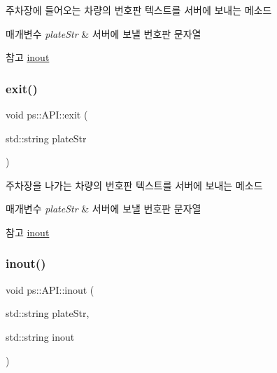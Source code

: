 주차장에 들어오는 차량의 번호판 텍스트를 서버에 보내는 메소드 


\begin{DoxyParams}{매개변수}
{\em plate\+Str} & 서버에 보낼 번호판 문자열 \\
\hline
\end{DoxyParams}
\begin{DoxySeeAlso}{참고}
\hyperlink{classps_1_1_a_p_i_a1b8af0de54794775c106e3e68fbe24a6}{inout} 
\end{DoxySeeAlso}
\mbox{\label{classps_1_1_a_p_i_ae8af546ae3b183fec0c6d3f68a7e9649}} 
\subsubsection{\texorpdfstring{exit()}{exit()}}
{\footnotesize\ttfamily void ps\+::\+A\+P\+I\+::exit (\begin{DoxyParamCaption}\item[{std\+::string}]{plate\+Str }\end{DoxyParamCaption})}



주차장을 나가는 차량의 번호판 텍스트를 서버에 보내는 메소드 


\begin{DoxyParams}{매개변수}
{\em plate\+Str} & 서버에 보낼 번호판 문자열 \\
\hline
\end{DoxyParams}
\begin{DoxySeeAlso}{참고}
\hyperlink{classps_1_1_a_p_i_a1b8af0de54794775c106e3e68fbe24a6}{inout} 
\end{DoxySeeAlso}
\mbox{\label{classps_1_1_a_p_i_a1b8af0de54794775c106e3e68fbe24a6}} 
\subsubsection{\texorpdfstring{inout()}{inout()}}
{\footnotesize\ttfamily void ps\+::\+A\+P\+I\+::inout (\begin{DoxyParamCaption}\item[{std\+::string}]{plate\+Str,  }\item[{std\+::string}]{inout }\end{DoxyParamCaption})}




